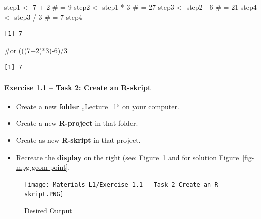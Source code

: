\documentclass[
  letterpaper,
  DIV=11,
  numbers=noendperiod]{scrartcl}
\let\oldparagraph\paragraph
\renewcommand{\paragraph}[1]{\oldparagraph{#1}\mbox{}}
\newenvironment{Shaded}{\begin{snugshade}}{\end{snugshade}}
\newcommand{\CommentTok}[1]{\textcolor[rgb]{0.37,0.37,0.37}{#1}}
\newcommand{\DecValTok}[1]{\textcolor[rgb]{0.68,0.00,0.00}{#1}}
\newcommand{\NormalTok}[1]{\textcolor[rgb]{0.00,0.23,0.31}{#1}}
\newcommand{\OtherTok}[1]{\textcolor[rgb]{0.00,0.23,0.31}{#1}}
\newcommand{\SpecialCharTok}[1]{\textcolor[rgb]{0.37,0.37,0.37}{#1}}
\begin{document}
\begin{Shaded}
\begin{Highlighting}[]
\NormalTok{step1 }\OtherTok{\textless{}{-}} \DecValTok{7} \SpecialCharTok{+} \DecValTok{2}      \CommentTok{\# = 9}
\NormalTok{step2 }\OtherTok{\textless{}{-}}\NormalTok{ step1 }\SpecialCharTok{*} \DecValTok{3}  \CommentTok{\# = 27}
\NormalTok{step3 }\OtherTok{\textless{}{-}}\NormalTok{ step2 }\SpecialCharTok{{-}} \DecValTok{6}  \CommentTok{\# = 21}
\NormalTok{step4 }\OtherTok{\textless{}{-}}\NormalTok{ step3 }\SpecialCharTok{/} \DecValTok{3}  \CommentTok{\# = 7}
\NormalTok{step4}
\end{Highlighting}
\end{Shaded}

\begin{verbatim}
[1] 7
\end{verbatim}

\begin{Shaded}
\begin{Highlighting}[]
\CommentTok{\#or}
\NormalTok{(((}\DecValTok{7}\SpecialCharTok{+}\DecValTok{2}\NormalTok{)}\SpecialCharTok{*}\DecValTok{3}\NormalTok{)}\SpecialCharTok{{-}}\DecValTok{6}\NormalTok{)}\SpecialCharTok{/}\DecValTok{3}
\end{Highlighting}
\end{Shaded}

\begin{verbatim}
[1] 7
\end{verbatim}

\hypertarget{exercise-1.1-task-2-create-an-r-skript}{%
\paragraph{Exercise 1.1 -- Task 2: Create an
R-skript}\label{exercise-1.1-task-2-create-an-r-skript}}

\begin{itemize}
\item
  Create a new \textbf{folder} „Lecture\_1`` on your computer.
\item
  Create a new \textbf{R-project} in that folder.
\item
  Create as new \textbf{R-skript} in that project.
\item
  Recreate the \textbf{display} on the right (see:
  Figure~\ref{fig-desired-output} and for solution
  Figure~\ref{fig-mpg-geom-point}.
\end{itemize}

\begin{figure}

{\centering \texttt{[image: Materials L1/Exercise 1.1 – Task 2 Create an R-skript.PNG]}

}

\caption{\label{fig-desired-output}Desired Output}

\end{figure}
\end{document}
